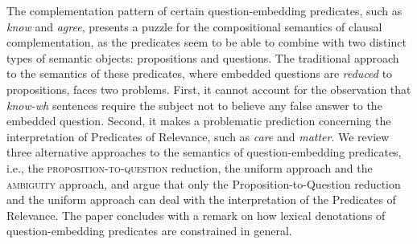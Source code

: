 The complementation pattern of certain question-embedding predicates, such as \textit{know} and \textit{agree}, presents a puzzle for the compositional semantics of clausal complementation, as the predicates seem to be able to combine with two distinct types of semantic objects: propositions and questions. The traditional approach to the semantics of these predicates, where embedded questions are \textit{reduced} to propositions, faces two problems. First, it cannot account for the observation that \textit{know-wh} sentences require the subject not to believe any false answer to the embedded question. Second, it makes a problematic prediction concerning the interpretation of Predicates of Relevance, such as \textit{care} and \textit{matter}. We review three alternative approaches to the semantics of question-embedding predicates, i.e., the \textsc{proposition-to-question} reduction, the uniform approach and the \textsc{ambiguity} approach, and argue that only the Proposition-to-Question reduction and the uniform approach can deal with the interpretation of the Predicates of Relevance. The paper concludes with a remark on how lexical denotations of question-embedding predicates are constrained in general.
\endinput